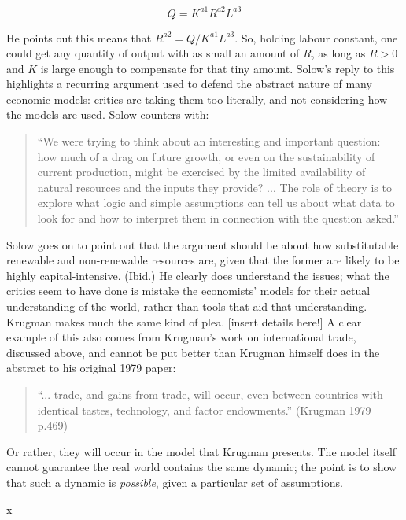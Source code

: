 \begin{equation}
Q=K^{a1}R^{a2}L^{a\text{3}}\label{eq:}
\end{equation}

He points out this means that $R^{a2}=Q/K^{a1}L^{a3}$. So, holding labour constant, one could get any quantity of output with as small an amount of $R$, as long as $R>0$ and $K$ is large enough to compensate for that tiny amount.  Solow's reply to this highlights a recurring argument used to defend the abstract nature of many economic models: critics are taking them too literally, and not considering how the models are used. Solow counters with:

\begin{quote}
``We were trying to think about an interesting and important question: how much of a drag on future growth, or even on the sustainability of current production, might be exercised by the limited availability of natural resources and the inputs they provide? ... The role of theory is to explore what logic and simple assumptions can tell us about what data to look for and how to interpret them in connection with the question asked.'' 
\end{quote}

Solow goes on to point out that the argument should be about how substitutable renewable and non-renewable resources are, given that the former are likely to be highly capital-intensive. (Ibid.) He clearly does understand the issues; what the critics seem to have done is mistake the economists' models for their actual understanding of the world, rather than tools that aid that understanding. Krugman makes much the same kind of plea. {[}insert details here!{]} A clear example of this also comes from Krugman's work on international trade, discussed above, and cannot be put better than Krugman himself does in the abstract to his original 1979 paper: 

\begin{quotation}
``... trade, and gains from trade, will occur, even between countries with identical tastes, technology, and factor endowments.'' (Krugman 1979 p.469) 
\end{quotation}

Or rather, they will occur in the model that Krugman presents. The model itself cannot guarantee the real world contains the same dynamic; the point is to show that such a dynamic is \emph{possible}, given a particular set of assumptions. 

x


